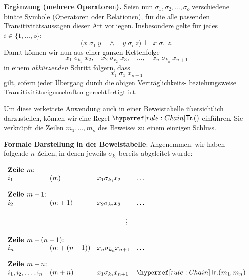 \documentclass[main.tex]{subfiles}
\begin{document}
\noindent
\textbf{Ergänzung (mehrere Operatoren).}  
Seien nun \(\sigma_1, \sigma_2, \dots, \sigma_o\) verschiedene binäre Symbole (Operatoren oder Relationen), für die alle passenden Transitivitätsaussagen dieser Art vorliegen. Insbesondere gelte für jedes \(i\in\{1,\ldots,o\}\):
\[
\bigl(x \;\sigma_1\; y \quad\land\quad y \;\sigma_i\; z\bigr)
\;\vdash\;
x \;\sigma_1\; z.
\]
Damit können wir nun aus einer ganzen Kettenfolge
\[
x_1 \;\sigma_{k_1}\; x_2,\quad
x_2 \;\sigma_{k_2}\; x_3,\quad
\dots,\quad
x_n \;\sigma_{k_n}\; x_{n+1}
\]
in einem \emph{abkürzenden} Schritt folgern, dass
\[
x_1 \;\sigma_1\; x_{n+1}
\]
gilt, sofern jeder Übergang durch die obigen Verträglichkeits- beziehungsweise Transitivitätseigenschaften gerechtfertigt ist.

\begin{remark}
Um diese verkettete Anwendung auch in einer Beweistabelle übersichtlich darzustellen, können wir eine Regel \(\rChain{}\) einführen. Sie verknüpft die Zeilen \(m_1,\dots,m_n\) des Beweises zu einem einzigen Schluss. 
\end{remark}

\noindent
\textbf{Formale Darstellung in der Beweistabelle}:  
Angenommen, wir haben folgende \(n\) Zeilen, in denen jeweils \(\sigma_{k_i}\) bereits abgeleitet wurde:

    \[
	\begin{array}{llclll}
            \multicolumn{6}{l}{\textbf{Zeile } m \text{:}}\\
             i_1 &  (m)  & \multicolumn{3}{l}{x_1\sigma_{k_1} x_2} & \dots \\
            \multicolumn{6}{l}{}\\
            \multicolumn{6}{l}{\textbf{Zeile } m+1 \text{:}}\\
             i_2 &  (m+1)  & \multicolumn{3}{l}{x_2\sigma_{k_2} x_3} & \dots \\
            \multicolumn{6}{c}{}\\
            \multicolumn{6}{c}{\vdots}\\
            \multicolumn{6}{l}{}\\
            \multicolumn{6}{l}{\textbf{Zeile } m+(n-1) \text{:}}\\
             i_n &  (m+(n-1))  & \multicolumn{3}{l}{x_n\sigma_{k_n} x_{n+1}} & \dots \\   
            \multicolumn{6}{l}{}\\
            \multicolumn{6}{l}{\textbf{Zeile } m+n \text{:}}\\
             i_1,i_2,\dots,i_n &  (m+n)  & \multicolumn{3}{l}{x_1\sigma_{k_1} x_{n+1}} & \rChain{m_1,m_n} 
        \end{array}
    \]
\end{document}

